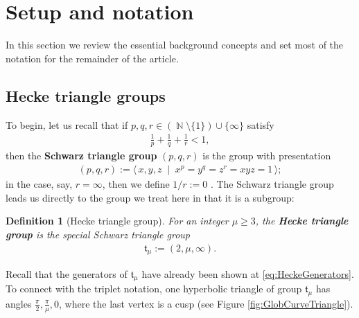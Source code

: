 \documentclass[11pt]{article}
\newtheorem{defin}{Definition}
\DeclareMathOperator{\NN}{\mathbb{N}}
\begin{document}
\section{Setup and notation}
In this section we review the essential background concepts and set most of the notation for the remainder of the article.  


\subsection{Hecke triangle groups}

    
To begin, let us recall that if $ p, q, r \in (\NN \setminus \{1\}) \cup \{\infty\}$ satisfy
    \begin{eqnarray}\label{eq;firstKindCriterium}
        \frac{1}{p} + \frac{1}{q} + \frac{1}{r} < 1,        
    \end{eqnarray}
then the \textbf{Schwarz triangle group} $ (p,q,r) $ is the group with presentation
    \begin{eqnarray*}
        (p,q,r) := \langle\, x, y, z \;\mid\; x^p = y^q = z^r = xyz = 1\,\rangle;
    \end{eqnarray*}
in the case, say, $ r = \infty $, then we define $ 1/r := 0 $ \cite{beardon1983}. The Schwarz triangle group leads us directly to the group we treat here in that it is a subgroup:
    \begin{defin}[Hecke triangle group]
        For an integer $ \mu\geq 3$, the \textbf{Hecke triangle group} is the special Schwarz triangle group
            \begin{eqnarray*}
                \mathfrak{t}_\mu := (2, \mu, \infty).        
            \end{eqnarray*}
    \end{defin}
Recall that the generators of $\mathfrak{t}_\mu $ have already been shown at \eqref{eq:HeckeGenerators}. To connect with the triplet notation, one hyperbolic triangle of group $\mathfrak{t}_\mu $ has angles $  \frac{\pi}{2}, \frac{\pi}{\mu}, 0 $, where the last vertex is a cusp (see Figure \ref{fig:GlobCurveTriangle}). 
\end{document}
